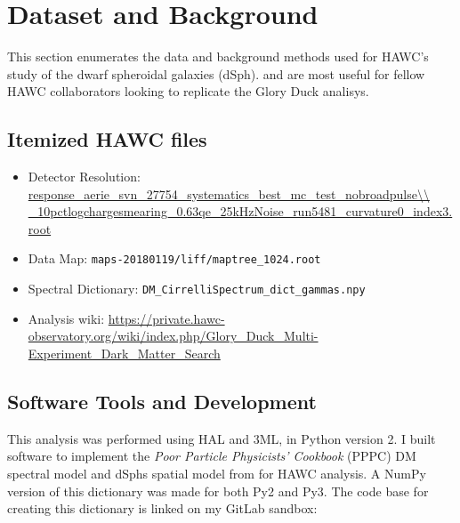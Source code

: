 \section{Dataset and Background \label{sec:gd_databgd}}

This section enumerates the data and background methods used for HAWC's study of the dwarf spheroidal galaxies (dSph).
 and  are most useful for fellow HAWC collaborators looking to replicate the Glory Duck analisys.

\subsection{Itemized HAWC files}\label{sec:gd_data}
\begin{itemize}
    \item Detector Resolution: \url{response\_aerie\_svn\_27754\_systematics\_best\_mc\_test\_nobroadpulse\\
    \_10pctlogchargesmearing\_0.63qe\_25kHzNoise\_run5481\_curvature0\_index3.root}
    \item Data Map: \texttt{maps-20180119/liff/maptree\_1024.root}
    \item Spectral Dictionary: \texttt{DM\_CirrelliSpectrum\_dict\_gammas.npy}
    \item Analysis wiki: \url{https://private.hawc-observatory.org/wiki/index.php/Glory_Duck_Multi-Experiment_Dark_Matter_Search}
\end{itemize}

\subsection{Software Tools and Development}\label{sec:gd_tools}

This analysis was performed using HAL and 3ML, in Python version 2\cite{Abeysekara_2017, vianello2015multimission}.
I built software to implement the \emph{Poor Particle Physicists' Cookbook} (PPPC) \cite{Cirelli_2011} DM spectral model and dSphs spatial model from \cite{Geringer_Sameth_2015} for HAWC analysis.
A NumPy version of this dictionary was made for both Py2 and Py3.
The code base for creating this dictionary is linked on my GitLab sandbox:

